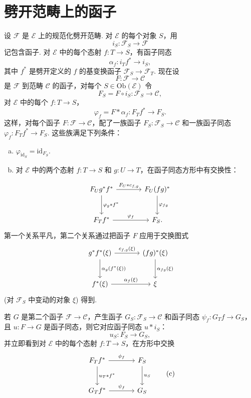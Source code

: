 \section{劈开范畴上的函子}

设 $\mathcal{F}$ 是 $\mathcal{E}$ 上的规范化劈开范畴. 对 $\mathcal{E}$ 的每个对象 $S$，用
\[
i_S \colon \mathcal{F}_S \longrightarrow \mathcal{F}
\]
记包含函子. 对 $\mathcal{E}$ 中的每个态射 $f \colon T \to S$，有函子同态
\[
\alpha_f \colon i_T f^{*} \longrightarrow i_S,
\]
其中 $f^{*}$ 是劈开定义的 $f$ 的基变换函子 $\mathcal{F}_S \to \mathcal{F}_T$. 现在设
\[
F \colon \mathcal{F} \longrightarrow \mathcal{C}
\]
是 $\mathcal{F}$ 到范畴 $\mathcal{C}$ 的函子，对每个 $S \in \mathrm{Ob}(\mathcal{E})$ 令
\[
F_S = F \circ i_S \colon \mathcal{F}_S \longrightarrow \mathcal{C},
\]
对 $\mathcal{E}$ 中的每个 $f \colon T \to S$，
\[
\varphi_f = F * \alpha_f \colon F_T f^{*} \longrightarrow F_S.
\]
这样，对每个函子 $F \colon \mathcal{F} \to \mathcal{C}$，配了一族函子 $F_S \colon \mathcal{F}_S \to \mathcal{C}$ 和一族函子同态 $\varphi_f \colon F_T f^{*} \to F_S$. 这些族满足下列条件：
\begin{enumerate}[a)]
\item $\varphi_{\mathrm{id}_S} = \mathrm{id}_{F_S}$.
\item 对 $\mathcal{E}$ 中的两个态射 $f \colon T \to S$ 和 $g \colon U \to T$，在函子同态方形中有交换性：
\end{enumerate}
\[
\begin{tikzcd}[row sep=large, column sep=large]
F_U g^{*} f^{*} \arrow[r,"{F_U * c_{f,g}}"] \arrow[d,"{\varphi_g * f^{*}}"] & F_U (fg)^{*} \arrow[d,"{\varphi_{fg}}"] \\
F_T f^{*} \arrow[r,"{\varphi_f}"] & F_S.
\end{tikzcd}
\]
第一个关系平凡，第二个关系通过把函子 $F$ 应用于交换图式
\[
\begin{tikzcd}[row sep=large, column sep=large]
g^{*} f^{*}(\xi) \arrow[r,"{c_{f,g}(\xi)}"] \arrow[d,"{\alpha_g(f^{*}(\xi))}"] & (fg)^{*}(\xi) \arrow[d,"{\alpha_{fg}(\xi)}"] \\
f^{*}(\xi) \arrow[r,"{\alpha_f(\xi)}"] & \xi
\end{tikzcd}
\]
(对 $\mathcal{F}_S$ 中变动的对象 $\xi$) 得到.

若 $G$ 是第二个函子 $\mathcal{F} \to \mathcal{C}$，产生函子 $G_S \colon \mathcal{F}_S \to \mathcal{C}$ 和函子同态 $\psi_f \colon G_T f \to G_S$，且 $u \colon F \to G$ 是函子同态，则它对应函子同态 $u * i_S$：
\[
u_S \colon F_S \longrightarrow G_S,
\]
并立即看到对 $\mathcal{E}$ 中的每个态射 $f \colon T \to S$，在方形中交换
\begin{equation}
\begin{tikzcd}[row sep=large, column sep=large]
F_T f^{*} \arrow[r,"{\phi_f}"] \arrow[d,"{u_T * f^{*}}"] & F_S \arrow[d,"{u_S}"] \\
G_T f^{*} \arrow[r,"{\psi_f}"] & G_S
\end{tikzcd} \tag{c}
\label{eq:VI.c}
\end{equation}

